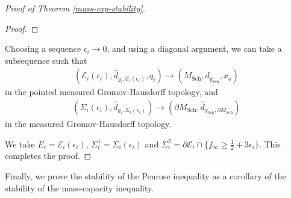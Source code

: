 \documentclass[letter]{amsart}
\theoremstyle{definition}
\theoremstyle{remark}
\begin{document}
\begin{proof}[Proof of Theorem \ref{mass-cap-stability}]
\begin{proof}
\end{proof}

Choosing a sequence $\epsilon _i \to 0$, and using a diagonal argument, we can take a subsequence such that 
\begin{align*}
	(\mathcal{E}_i(\epsilon _i), \hat{d}_{g_i, \mathcal{E}_i(\epsilon _i)}, q_i) \to (M_{\mathrm{Sch}}, d_{g_{\mathrm{Sch}}}, x_o)
\end{align*}
in the pointed measured Gromov-Hausdorff topology, and 
\begin{align*}
	(\Sigma _i(\epsilon _i), \hat{d}_{g_i, \Sigma _i(\epsilon _i)}) \to (\partial M_{\mathrm{Sch}}, \hat{d}_{g_{\mathrm{Sch}}, \partial M_{\mathrm{Sch}}})	
\end{align*}
in the measured Gromov-Hausdorff topology.


We take $E_i = \mathcal{E}_i(\epsilon _i)$, $\Sigma _i^1 = \Sigma _i(\epsilon _i)$ and $\Sigma _i^2 = \partial \mathcal{E}_i \cap \{f_\infty \geq \frac{1}{2} + 3 \epsilon _i\} $. This completes the proof.

\end{proof}

Finally, we prove the stability of the Penrose inequality as a corollary of the stability of the mass-capacity inequality.
\end{document}
